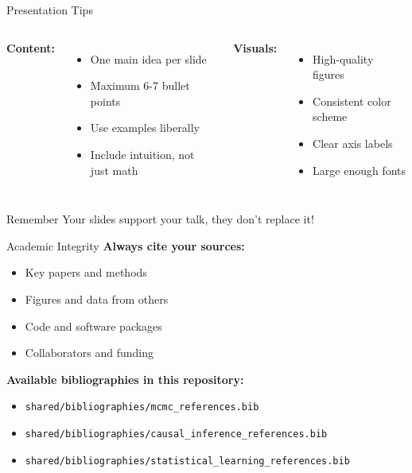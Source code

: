 \documentclass[aspectratio=169]{beamer}
\begin{document}
\begin{frame}{Presentation Tips}
  \begin{columns}
    \textbf{Content:}
    \begin{itemize}
      \item One main idea per slide
      \item Maximum 6-7 bullet points
      \item Use examples liberally
      \item Include intuition, not just math
    \end{itemize}

    \textbf{Visuals:}
    \begin{itemize}
      \item High-quality figures
      \item Consistent color scheme
      \item Clear axis labels
      \item Large enough fonts
    \end{itemize}
  \end{columns}

  \vspace{1em}

  \begin{alertbox}{Remember}
    Your slides support your talk, they don't replace it!
  \end{alertbox}
\end{frame}

\begin{frame}{Academic Integrity}
  \textbf{Always cite your sources:}

  \begin{itemize}
    \item Key papers and methods
    \item Figures and data from others
    \item Code and software packages
    \item Collaborators and funding
  \end{itemize}

  \vspace{0.5em}

  \textbf{Available bibliographies in this repository:}
  \begin{itemize}
    \item \texttt{shared/bibliographies/mcmc\_references.bib}
    \item \texttt{shared/bibliographies/causal\_inference\_references.bib}
    \item \texttt{shared/bibliographies/statistical\_learning\_references.bib}
  \end{itemize}
\end{frame}
\end{document}
